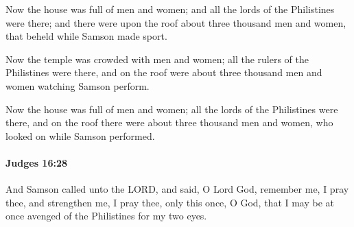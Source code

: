 			\begin{versebox}
					\item[BHS] 
					\item[ASV] Now the house was full of men and women; and all the lords of the Philistines were there; and there were upon the roof about three thousand men and women, that beheld while Samson made sport.
					\item[NIV] Now the temple was crowded with men and women; all the rulers of the Philistines were there, and on the roof were about three thousand men and women watching Samson perform.
					\item[NRSV] Now the house was full of men and women; all the lords of the Philistines were there, and on the roof there were about three thousand men and women, who looked on while Samson performed.
			\end{versebox}

		\paragraph{Judges 16:28} %
			\label{JUDGES-16-28}

			And Samson called unto the LORD, and said, O Lord God, remember me, I pray thee, and strengthen me, I pray thee, only this once, O God, that I may be at once avenged of the Philistines for my two eyes.

